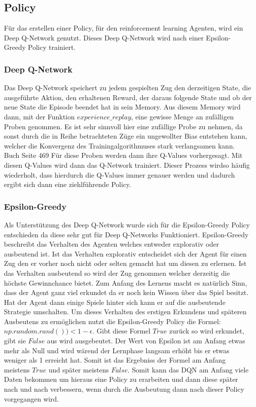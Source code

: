 \subsection{Policy}
Für das erstellen einer Policy, für den reinforcement learning Agenten, wird ein Deep Q-Network genutzt. Dieses Deep Q-Network wird nach einer Epsilon-Greedy Policy trainiert.

\subsubsection{Deep Q-Network}
Das Deep Q-Network speichert zu jedem gespielten Zug den derzeitigen State, die ausgeführte Aktion, den erhaltenen Reward, der daraus folgende State und ob der neue State die Episode beendet hat in sein Memory. Aus diesem Memory wird dann, mit der Funktion $experience\_replay$, eine gewisse Menge an zufälligen Proben genommen. Es ist sehr sinnvoll hier eine zufällige Probe zu nehmen, da sonst durch die in Reihe betrachteten Züge ein ungewollter Bias entstehen kann, welcher die Konvergenz des Trainingalgorithmuses stark verlangsamen kann.
\colorbox{red!30}{Buch Seite 469}
Für diese Proben werden dann ihre Q-Values vorhergesagt. Mit diesen Q-Values wird dann das Q-Network trainiert. 
Dieser Prozess wirdso häufig wiederholt, dass hierdurch die Q-Values immer genauer  werden und dadurch ergibt sich dann eine ziehlführende Policy.


\subsubsection{Epsilon-Greedy}
Als Unterstützung des Deep Q-Network wurde sich für die Epsilon-Greedy Policy entschieden da diese sehr gut für Deep Q-Networks Funktioniert. Epsilon-Greedy beschreibt das Verhalten des Agenten welches entweder explorativ oder ausbeutend ist. Ist das Verhalten explorativ entscheidet sich der Agent für einen Zug den er vorher noch nicht oder selten gemacht hat um diesen zu erlernen. Ist das Verhalten ausbeutend so wird der Zug genommen welcher derzeitig die höchste Gewinnchance bietet. Zum Anfang des Lernens macht es natürlich Sinn, dass der Agent ganz viel erkundet da er noch kein Wissen über das Spiel besitzt. Hat der Agent dann einige Spiele hinter sich kann er auf die ausbeutende Strategie umschalten. Um dieses Verhalten des erstigen Erkundens und späteren Ausbeutens zu ermöglichen nutzt die Epsilon-Greedy Policy die Formel: $np.random.rand())<1-\epsilon$. Gibt diese Formel $True$ zurück so wird erkundet, gibt sie $False$ aus wird ausgebeutet. Der Wert von Epsilon ist am Anfang etwas mehr als Null und wird wärend der Lernphase langsam erhöht bis er etwas weniger als 1 erreicht hat. Somit ist das Ergebniss der Formel am Anfang meistens $True$ und später meistens $False$. Somit kann das DQN am Anfang viele Daten bekommen um hieraus eine Policy zu erarbeiten und dann diese später nach und nach verbessern, wenn durch die Ausbeutung dann nach dieser Policy vorgegangen wird.

